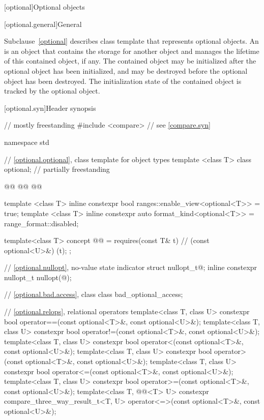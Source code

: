 [optional]{Optional objects}

[optional.general]{General}

\pnum
Subclause~\ref{optional} describes class template  that represents
optional objects.
An  is an
object that contains the storage for another object and manages the lifetime of
this contained object, if any. The contained object may be initialized after
the optional object has been initialized, and may be destroyed before the
optional object has been destroyed. The initialization state of the contained
object is tracked by the optional object.

[optional.syn]{Header  synopsis}

%
\begin{codeblock}
// mostly freestanding
#include <compare>              // see \ref{compare.syn}

namespace std {
  // \ref{optional.optional}, class template  for object types
  template <class T>
  class optional; // partially freestanding

  @@
  @@
  @@

  template <class T>
  inline constexpr bool ranges::enable_view<optional<T>> = true;
  template <class T>
  inline constexpr auto format_kind<optional<T>> = range_format::disabled;

  template<class T>
    concept @@ = requires(const T& t) {       // (const optional<U>&){ }(t);
    };

  // \ref{optional.nullopt}, no-value state indicator
  struct nullopt_t{@\seebelow@};
  inline constexpr nullopt_t nullopt(@\unspec@);

  // \ref{optional.bad.access}, class 
  class bad_optional_access;

  // \ref{optional.relops}, relational operators
  template<class T, class U>
    constexpr bool operator==(const optional<T>&, const optional<U>&);
  template<class T, class U>
    constexpr bool operator!=(const optional<T>&, const optional<U>&);
  template<class T, class U>
    constexpr bool operator<(const optional<T>&, const optional<U>&);
  template<class T, class U>
    constexpr bool operator>(const optional<T>&, const optional<U>&);
  template<class T, class U>
    constexpr bool operator<=(const optional<T>&, const optional<U>&);
  template<class T, class U>
    constexpr bool operator>=(const optional<T>&, const optional<U>&);
  template<class T, @@<T> U>
    constexpr compare_three_way_result_t<T, U>
      operator<=>(const optional<T>&, const optional<U>&);

}
\end{codeblock}
